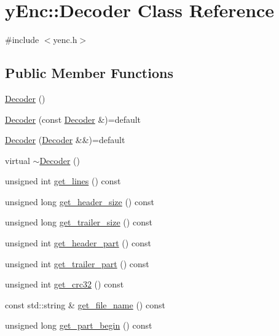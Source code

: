 \hypertarget{classy_enc_1_1_decoder}{}\section{y\+Enc\+:\+:Decoder Class Reference}
\label{classy_enc_1_1_decoder}


{\ttfamily \#include $<$yenc.\+h$>$}

\subsection*{Public Member Functions}
\begin{DoxyCompactItemize}
\item 
\hyperlink{classy_enc_1_1_decoder_af806b51596a3984a3eb2b1c75403c95f}{Decoder} ()
\item 
\hyperlink{classy_enc_1_1_decoder_a5dfd7073dfac210273691c058d503208}{Decoder} (const \hyperlink{classy_enc_1_1_decoder}{Decoder} \&)=default
\item 
\hyperlink{classy_enc_1_1_decoder_aa1a82a03f753c52a583e3b9a396e2c2f}{Decoder} (\hyperlink{classy_enc_1_1_decoder}{Decoder} \&\&)=default
\item 
virtual \hyperlink{classy_enc_1_1_decoder_a8e021ad88e0aaef585e4a6a0ed120467}{$\sim$\+Decoder} ()
\item 
unsigned int \hyperlink{classy_enc_1_1_decoder_a3d660308cbae7e42c7dc7ed16a4c1308}{get\+\_\+lines} () const
\item 
unsigned long \hyperlink{classy_enc_1_1_decoder_a9a1344c2af59e63c4216ac98f1514187}{get\+\_\+header\+\_\+size} () const
\item 
unsigned long \hyperlink{classy_enc_1_1_decoder_a93df0351daec3237ebfa4cdf0acf3904}{get\+\_\+trailer\+\_\+size} () const
\item 
unsigned int \hyperlink{classy_enc_1_1_decoder_a50992c8804460d064168ec05c8beb661}{get\+\_\+header\+\_\+part} () const
\item 
unsigned int \hyperlink{classy_enc_1_1_decoder_ade08ae4673a91d7ba032d0d4d7815172}{get\+\_\+trailer\+\_\+part} () const
\item 
unsigned int \hyperlink{classy_enc_1_1_decoder_aa93a059f7eb8418dcb93f2f65ba86278}{get\+\_\+crc32} () const
\item 
const std\+::string \& \hyperlink{classy_enc_1_1_decoder_a1a1c8d5184b9984138662e0bc2ce6bd3}{get\+\_\+file\+\_\+name} () const
\item 
unsigned long \hyperlink{classy_enc_1_1_decoder_ac40379f6d0fc2dbb60864df1cee65b03}{get\+\_\+part\+\_\+begin} () const

\end{DoxyCompactItemize}

